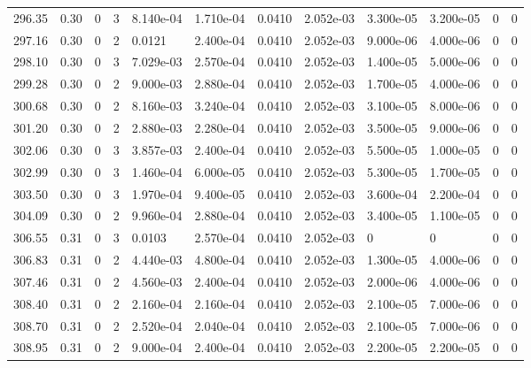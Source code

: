 \documentclass[preview]{standalone}
\begin{document}
{{{{{{{{{{{\begin{tabular}{L{1.2cm}C{1.2cm} C{0.3cm}C{0.5cm} C{1.4cm}C{1.4cm} C{1.4cm}C{1.4cm} C{1.6cm}C{1.6cm} C{1.6cm}C{1.6cm}}
  296.35  &  0.30  & 0     &  3 &  8.140e-04  & 1.710e-04  &  0.0410&   2.052e-03& 3.300e-05 & 3.200e-05   &  0 & 0  \\ 
  297.16  &  0.30  & 0     &  2 &  0.0121  & 2.400e-04  &  0.0410&   2.052e-03& 9.000e-06 & 4.000e-06   &  0 & 0  \\ 
  298.10  &  0.30  & 0     &  3 &  7.029e-03  & 2.570e-04  &  0.0410&   2.052e-03& 1.400e-05 & 5.000e-06   &  0 & 0  \\ 
  299.28  &  0.30  & 0     &  2 &  9.000e-03  & 2.880e-04  &  0.0410&   2.052e-03& 1.700e-05 & 4.000e-06   &  0 & 0  \\ 
  300.68  &  0.30  & 0     &  2 &  8.160e-03  & 3.240e-04  &  0.0410&   2.052e-03& 3.100e-05 & 8.000e-06   &  0 & 0  \\ 
  301.20  &  0.30  & 0     &  2 &  2.880e-03  & 2.280e-04  &  0.0410&   2.052e-03& 3.500e-05 & 9.000e-06   &  0 & 0  \\ 
  302.06  &  0.30  & 0     &  3 &  3.857e-03  & 2.400e-04  &  0.0410&   2.052e-03& 5.500e-05 & 1.000e-05   &  0 & 0  \\ 
  302.99  &  0.30  & 0     &  3 &  1.460e-04  & 6.000e-05  &  0.0410&   2.052e-03& 5.300e-05 & 1.700e-05   &  0 & 0  \\ 
  303.50  &  0.30  & 0     &  3 &  1.970e-04  & 9.400e-05  &  0.0410&   2.052e-03& 3.600e-04 & 2.200e-04   &  0 & 0  \\ 
  304.09  &  0.30  & 0     &  2 &  9.960e-04  & 2.880e-04  &  0.0410&   2.052e-03& 3.400e-05 & 1.100e-05   &  0 & 0  \\ 
  306.55  &  0.31  & 0     &  3 &  0.0103  & 2.570e-04  &  0.0410&   2.052e-03& 0 & 0   &  0 & 0  \\ 
  306.83  &  0.31  & 0     &  2 &  4.440e-03  & 4.800e-04  &  0.0410&   2.052e-03& 1.300e-05 & 4.000e-06   &  0 & 0  \\ 
  307.46  &  0.31  & 0     &  2 &  4.560e-03  & 2.400e-04  &  0.0410&   2.052e-03& 2.000e-06 & 4.000e-06   &  0 & 0  \\ 
  308.40  &  0.31  & 0     &  2 &  2.160e-04  & 2.160e-04  &  0.0410&   2.052e-03& 2.100e-05 & 7.000e-06   &  0 & 0  \\ 
  308.70  &  0.31  & 0     &  2 &  2.520e-04  & 2.040e-04  &  0.0410&   2.052e-03& 2.100e-05 & 7.000e-06   &  0 & 0  \\ 
  308.95  &  0.31  & 0     &  2 &  9.000e-04  & 2.400e-04  &  0.0410&   2.052e-03& 2.200e-05 & 2.200e-05   &  0 & 0  \\ 
\hline 
\end{tabular} 

}}}}}}}}}}}
\end{document}
